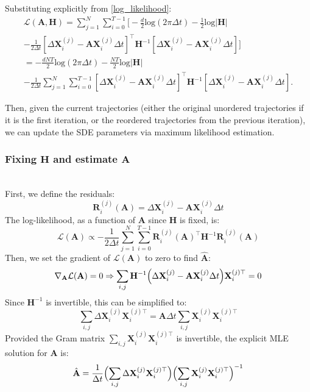 \documentclass[conference]{IEEEtran}
\begin{document}
Substituting explicitly from \eqref{log_likelihood}:
\begin{multline}\label{explicit_log_likelihood}
    \mathcal{L}(\mathbf{A}, \mathbf{H}) = \sum_{j=1}^{N} \sum_{i=0}^{T-1} \Biggl[-\frac{d}{2}\text{log}(2\pi\Delta t) - \frac{1}{2}\text{log}|\mathbf{H}| \\
        - \frac{1}{2\Delta t}[\Delta\mathbf{X}_i^{(j)} - \mathbf{AX}_i^{(j)}\Delta t]^\top\mathbf{H}^{-1}[\Delta\mathbf{X}_i^{(j)} - \mathbf{AX}_i^{(j)}\Delta t]\Biggr] \\
        = -\frac{dNT}{2}\text{log}(2\pi\Delta t)-\frac{NT}{2}\text{log}|\mathbf{H}|\\
        -\frac{1}{2\Delta t}\sum_{j=1}^{N} \sum_{i=0}^{T-1}[\Delta \mathbf{X}_i^{(j)} - \mathbf{A}\mathbf{X}_i^{(j)}\Delta t]^\top\mathbf{H}^{-1}[\Delta\mathbf{X}_i^{(j)} - \mathbf{A}\mathbf{X}_i^{(j)}\Delta t].
\end{multline}

Then, given the current trajectories (either the original unordered trajectories if it is the first
iteration, or the reordered trajectories from the previous iteration), we can update the SDE parameters via maximum likelihood estimation.

\mbox{}
\subsubsection{Fixing $\mathbf{H}$ and estimate $\mathbf{A}$} \mbox{}\\
First, we define the residuals:
\[
\mathbf{R}_i^{(j)}(\mathbf{A})
= 
\Delta\mathbf{X}_i^{(j)} - \mathbf{AX}_i^{(j)}\Delta t
\]
The log-likelihood, as a function of $\mathbf{A}$ since $\mathbf{H}$ is fixed, is:
\[
    \mathcal{L}(\mathbf{A}) \propto -\frac{1}{2\Delta t}
    \sum_{j=1}^{N} \sum_{i=0}^{T-1} \mathbf{R}_i^{(j)}(\mathbf{A})^\top \mathbf{H}^{-1}\mathbf{R}_i^{(j)}(\mathbf{A})
\]
Then, we set the gradient of $\mathcal{L}(\mathbf{A})$ to zero to find $\hat{\mathbf{A}}$:
\[
    \nabla_{\mathbf{A}}\mathcal{L}(\mathbf{A}) = 0 \Rightarrow
    \sum_{i, j} \mathbf{H}^{-1}\Bigl(\Delta\mathbf{X}_i^{(j)} - \mathbf{AX}_i^{(j)}\Delta t\Bigr)\mathbf{X}_i^{(j)\top} = 0
\]
Since $\mathbf{H}^{-1}$ is invertible, this can be simplified to:
\[
    \sum_{i, j} \Delta\mathbf{X}_i^{(j)}\mathbf{X}_i^{(j)\top}
    = \mathbf{A}\Delta t \sum_{i, j}\mathbf{X}_i^{(j)}\mathbf{X}_i^{(j)\top}
\]
Provided the Gram matrix $\sum_{i, j}\mathbf{X}_i^{(j)}\mathbf{X}_i^{(j)\top}$ is invertible, the explicit MLE solution for
$\mathbf{A}$ is:
\begin{equation}\label{A_MLE}
    \hat{\mathbf{A}} = \frac{1}{\Delta t}\Bigl(\sum_{i, j}\Delta\mathbf{X}_i^{(j)}\mathbf{X}_i^{(j)\top}\Bigr)\Bigl(\sum_{i, j}\mathbf{X}_i^{(j)}\mathbf{X}_i^{(j)\top}\Bigr)^{-1}
\end{equation}
\end{document}
